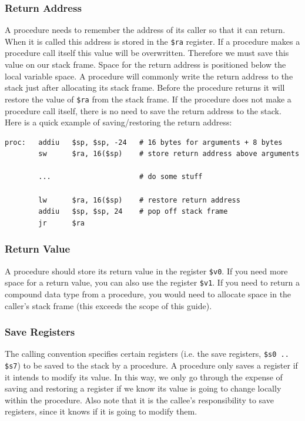 \documentclass[12pt]{article}
\begin{document}
\subsubsection{Return Address}

A procedure needs to remember the address of its caller so that it can
     return. When it is called this address is stored in the \texttt{\$ra}
     register. If a procedure makes a procedure call itself this value will be
     overwritten. Therefore we must save this value on our stack frame. Space
     for the return address is positioned below the local variable space. A
     procedure will commonly write the return address to the stack just after
     allocating its stack frame. Before the procedure returns it will restore
     the value of \texttt{\$ra} from the stack frame. If the procedure does not
     make a procedure call itself, there is no need to save the return address
     to the stack.\\

Here is a quick example of saving/restoring the return address:
\begin{lstlisting}
proc:   addiu   $sp, $sp, -24   # 16 bytes for arguments + 8 bytes
        sw      $ra, 16($sp)    # store return address above arguments

        ...                     # do some stuff

        lw      $ra, 16($sp)    # restore return address
        addiu   $sp, $sp, 24    # pop off stack frame
        jr      $ra
\end{lstlisting}
\vspace{-0.25in}
\subsubsection{Return Value}

A procedure should store its return value in the register \texttt{\$v0}. If you
     need more space for a return value, you can also use the register
     \texttt{\$v1}. If you need to return a compound data type from a procedure,
     you would need to allocate space in the caller's stack frame (this exceeds
     the scope of this guide).

\subsubsection{Save Registers}
\label{sec:saveregs}

The calling convention specifies certain registers (i.e. the save registers,
     \texttt{\$s0 .. \$s7}) to be saved to the stack by a procedure. A procedure
     only saves a register if it intends to modify its value. In this way, we
     only go through the expense of saving and restoring a register if we know
     its value is going to change locally within the procedure. Also note that
     it is the callee's responsibility to save registers, since it knows if it
     is going to modify them.\\
\end{document}
